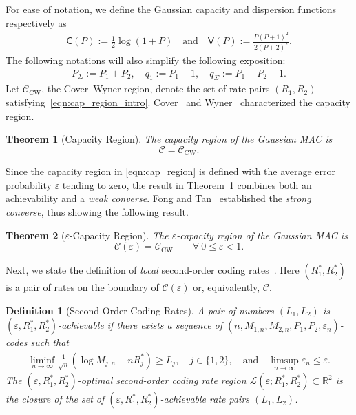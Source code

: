 \documentclass[11pt,onecolumn]{IEEEtran}
\newcommand{\calC}{\mathcal{C}}
\newcommand{\calL}{\mathcal{L}}
\newcommand{\bbR}{\mathbb{R}}
\newcommand{\rvC}{\mathsf{C}}
\newcommand{\rvV}{\mathsf{V}}
\newcommand{\eps}{\varepsilon}
\newtheorem{theorem}{Theorem}
\newtheorem{definition}{Definition}
\begin{document}
For ease of notation, we define the Gaussian capacity and dispersion functions respectively as 
\begin{align}
\rvC(P):= \frac{1}{2}\log(1+P)\quad\mbox{and}\quad \rvV(P):=\frac{P(P+1)^2}{2(P+2)^2}.
\end{align}
The following notations will also simplify the following exposition:
\begin{align}
P_\Sigma:=P_1+P_2,\quad q_1:=P_1+1,\quad q_\Sigma:= P_1+P_2+1.
\end{align}
Let $\calC_{\mathrm{CW}}$, the Cover--Wyner region, denote the set of rate pairs $(R_1, R_2)$ satisfying~\eqref{eqn:cap_region_intro}.
  Cover~\cite{Cover1975SomeAdvances} and Wyner~\cite{wyner74} characterized the capacity region.
\begin{theorem}[Capacity Region] \label{thm:first-order-weak}
The capacity region of the Gaussian MAC  is
\begin{equation}
\calC = \calC_{\mathrm{CW}}.
\end{equation}
\end{theorem}
Since the capacity region in \eqref{eqn:cap_region} is defined with the average error probability $\eps$ tending to zero, the result in Theorem~\ref{thm:first-order-weak} combines both an achievability and a {\em weak converse}. Fong and Tan~\cite{fongtan16} established the {\em strong converse}, thus showing the following result. 
\begin{theorem}[$\eps$-Capacity Region] \label{thm:first-order-strong}
The $\eps$-capacity region of the Gaussian MAC  is
\begin{equation}
\calC(\eps) = \calC_{\mathrm{CW}}\qquad\forall\ 0\le \eps<1.
\end{equation}
\end{theorem}

Next, we state the definition of  {\em local} second-order coding rates~\cite{Tan14}.   Here    $(R_1^*, R_2^*)$ is a pair of rates   on the boundary of $\calC(\eps)$ or, equivalently, $\calC$. 

\begin{definition}[Second-Order Coding Rates] \label{def:second}
A pair of numbers $(L_1, L_2)$ is {\em $(\eps,R_1^*,R_2^*)$-achievable} if there exists a sequence of $(n,M_{1,n},M_{2,n},P_1, P_2,\eps_n)$-codes such that  
\begin{align}
\liminf_{n\to\infty}\frac{1}{\sqrt{n}}(\log M_{j,n} - nR_j^*) \ge L_j,\quad j \in\{ 1,2\},\quad\mbox{and}\quad \limsup_{n\to\infty}\eps_n \le \eps. \label{eqn:second_def}
\end{align}
The {\em $(\eps,R_1^*,R_2^*)$-optimal second-order coding rate region} $\calL(\eps;R_1^*,R_2^*) \subset\bbR^2$ is  the closure of the  set of  $(\eps,R_1^*,R_2^*)$-achievable rate pairs  $(L_1, L_2)$. 
\end{definition}
\end{document}
